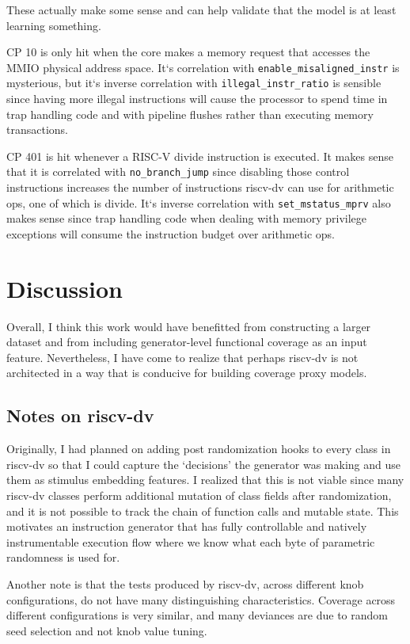\documentclass[sigconf,noacm]{acmart}
\begin{document}
These actually make some sense and can help validate that the model is at least learning something.

CP 10 is only hit when the core makes a memory request that accesses the MMIO physical address space.
It`s correlation with \verb|enable_misaligned_instr| is mysterious, but it`s inverse correlation with \verb|illegal_instr_ratio| is sensible since having more illegal instructions will cause the processor to spend time in trap handling code and with pipeline flushes rather than executing memory transactions.

CP 401 is hit whenever a RISC-V divide instruction is executed.
It makes sense that it is correlated with \verb|no_branch_jump| since disabling those control instructions increases the number of instructions riscv-dv can use for arithmetic ops, one of which is divide.
It`s inverse correlation with \verb|set_mstatus_mprv| also makes sense since trap handling code when dealing with memory privilege exceptions will consume the instruction budget over arithmetic ops.

\section{Discussion}

Overall, I think this work would have benefitted from constructing a larger dataset and from including generator-level functional coverage as an input feature.
Nevertheless, I have come to realize that perhaps riscv-dv is not architected in a way that is conducive for building coverage proxy models.

\subsection{Notes on riscv-dv}

Originally, I had planned on adding post randomization hooks to every class in riscv-dv so that I could capture the `decisions' the generator was making and use them as stimulus embedding features.
I realized that this is not viable since many riscv-dv classes perform additional mutation of class fields after randomization, and it is not possible to track the chain of function calls and mutable state.
This motivates an instruction generator that has fully controllable and natively instrumentable execution flow where we know what each byte of parametric randomness is used for.

Another note is that the tests produced by riscv-dv, across different knob configurations, do not have many distinguishing characteristics.
Coverage across different configurations is very similar, and many deviances are due to random seed selection and not knob value tuning.
\end{document}
